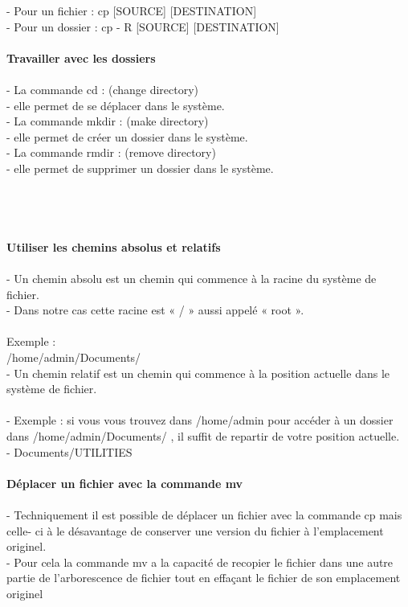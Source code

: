 \documentclass[10pt,a4paper]{article}
\begin{document}
- Pour un fichier : cp [SOURCE] [DESTINATION] \\
- Pour un dossier : cp - R [SOURCE] [DESTINATION]\\\\
{\large\textbf{Travailler avec les dossiers }}\\\\
- La commande cd : (change directory) \\
- elle permet de se déplacer dans le système.\\
- La commande mkdir : (make directory)\\
- elle permet de créer un dossier dans le système.\\
- La commande rmdir : (remove directory)  \\
- elle permet de supprimer un dossier dans le système.\\\\\\\\\\
{\large\textbf{Utiliser les chemins absolus et relatifs }}\\\\
- Un chemin absolu est un chemin qui commence à la racine du système de fichier. \\
- Dans notre cas cette racine est « / » aussi appelé « root ». \\\\
Exemple : \\
/home/admin/Documents/ \\
- Un chemin relatif est un chemin qui commence à la position actuelle dans le système de fichier.\\\\
- Exemple : si vous vous trouvez dans /home/admin pour accéder à un dossier dans /home/admin/Documents/ , il suffit de repartir de votre position actuelle.\\ 
- Documents/UTILITIES\\\\
{\large\textbf{Déplacer un fichier avec la commande mv }}\\\\
- Techniquement il est possible de déplacer un fichier avec la commande cp mais celle- ci à le désavantage de conserver une version du fichier à l’emplacement originel.\\ 
- Pour cela la commande mv a la capacité de recopier le fichier dans une autre partie de l’arborescence de fichier tout en effaçant le fichier de son emplacement originel \\\\
\end{document}
